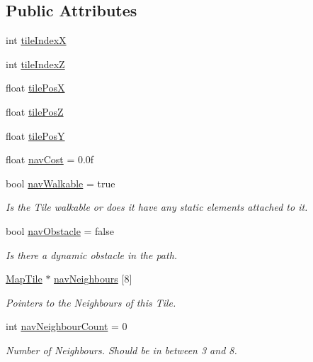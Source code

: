 \subsection*{Public Attributes}
\begin{DoxyCompactItemize}
\item 
int \mbox{\hyperlink{classpiolot_1_1_map_tile_ab1585fe7db159adb817540c7aa23729a}{tile\+IndexX}}
\item 
int \mbox{\hyperlink{classpiolot_1_1_map_tile_ad32071e9a413708d23c3ff98a49a654a}{tile\+IndexZ}}
\item 
float \mbox{\hyperlink{classpiolot_1_1_map_tile_a20153a41995e1fc00ae404bb0beea51d}{tile\+PosX}}
\item 
float \mbox{\hyperlink{classpiolot_1_1_map_tile_a2581410650fd7b09bf27aada53a652e7}{tile\+PosZ}}
\item 
float \mbox{\hyperlink{classpiolot_1_1_map_tile_aadf32877f16a8e69a591c64084da2667}{tile\+PosY}}
\item 
float \mbox{\hyperlink{classpiolot_1_1_map_tile_a0a8329aad9563449e69940e754c0eab7}{nav\+Cost}} = 0.\+0f
\item 
bool \mbox{\hyperlink{classpiolot_1_1_map_tile_a917058380d87af864438c30f3a65c774}{nav\+Walkable}} = true
\begin{DoxyCompactList}\small\item\em Is the Tile walkable or does it have any static elements attached to it. \end{DoxyCompactList}\item 
bool \mbox{\hyperlink{classpiolot_1_1_map_tile_ac30c95a0900b0b204d002fac6206934b}{nav\+Obstacle}} = false
\begin{DoxyCompactList}\small\item\em Is there a dynamic obstacle in the path. \end{DoxyCompactList}\item 
\mbox{\hyperlink{classpiolot_1_1_map_tile}{Map\+Tile}} $\ast$ \mbox{\hyperlink{classpiolot_1_1_map_tile_acc1c622d4a9446293840af35180f61d7}{nav\+Neighbours}} \mbox{[}8\mbox{]}
\begin{DoxyCompactList}\small\item\em Pointers to the Neighbours of this Tile. \end{DoxyCompactList}\item 
int \mbox{\hyperlink{classpiolot_1_1_map_tile_ace07e3f8b0ef22f37759d1dd37e54a03}{nav\+Neighbour\+Count}} = 0
\begin{DoxyCompactList}\small\item\em Number of Neighbours. Should be in between 3 and 8. \end{DoxyCompactList}\item 

\end{DoxyCompactItemize}
